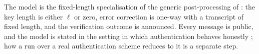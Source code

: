 
The model is the fixed-length specialisation of the generic post-processing
of \cite[Sec.~4.1, Protocol~1, steps~2--5]{tupkary2026decoy}: the key length
is either $\ell$ or zero, error correction is one-way with a transcript of
fixed length, and the verification outcome is announced. Every message is
public, and the model is stated in the setting in which authentication
behaves honestly \cite[Sec.~3.2]{tupkary2026decoy}; how a run over a real
authentication scheme reduces to it is a separate step.

